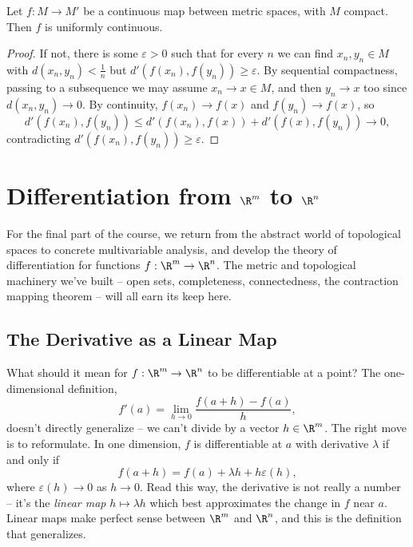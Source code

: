 \begin{theorem}
    Let $f: M \rightarrow M'$ be a continuous map between metric spaces, with $M$ compact. Then $f$ is uniformly continuous.
\end{theorem}
\begin{proof}
    If not, there is some $\varepsilon > 0$ such that for every $n$ we can find $x_n, y_n \in M$ with $d(x_n, y_n) < \frac{1}{n}$ but $d'(f(x_n), f(y_n)) \geq \varepsilon$. By sequential compactness, passing to a subsequence we may assume $x_n \rightarrow x \in M$, and then $y_n \rightarrow x$ too since $d(x_n, y_n) \rightarrow 0$. By continuity, $f(x_n) \rightarrow f(x)$ and $f(y_n) \rightarrow f(x)$, so
    $$
    d'(f(x_n), f(y_n)) \leq d'(f(x_n), f(x)) + d'(f(x), f(y_n)) \rightarrow 0,
    $$
    contradicting $d'(f(x_n), f(y_n)) \geq \varepsilon$.
\end{proof}

\section{Differentiation from $\R^m$ to $\R^n$}

For the final part of the course, we return from the abstract world of topological spaces to concrete multivariable analysis, and develop the theory of differentiation for functions $f: \R^m \rightarrow \R^n$. The metric and topological machinery we've built -- open sets, completeness, connectedness, the contraction mapping theorem -- will all earn its keep here.

\subsection{The Derivative as a Linear Map}

What should it mean for $f: \R^m \rightarrow \R^n$ to be differentiable at a point? The one-dimensional definition,
$$
f'(a) = \lim_{h \to 0} \frac{f(a + h) - f(a)}{h},
$$
doesn't directly generalize -- we can't divide by a vector $h \in \R^m$. The right move is to reformulate. In one dimension, $f$ is differentiable at $a$ with derivative $\lambda$ if and only if
$$
f(a + h) = f(a) + \lambda h + h\varepsilon(h),
$$
where $\varepsilon(h) \rightarrow 0$ as $h \rightarrow 0$. Read this way, the derivative is not really a number -- it's the \emph{linear map} $h \mapsto \lambda h$ which best approximates the change in $f$ near $a$. Linear maps make perfect sense between $\R^m$ and $\R^n$, and this is the definition that generalizes.

